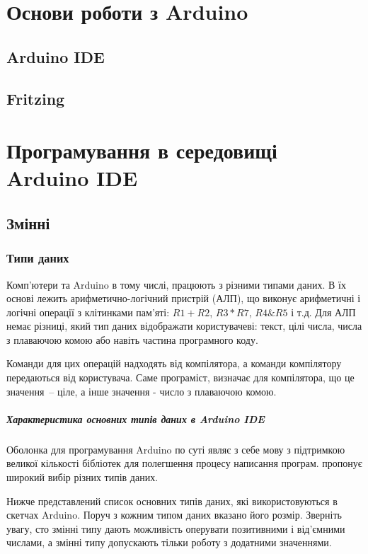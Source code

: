 \documentclass[12pt,a4paper]{book}  %
\begin{document}
\chapter{Основи роботи з Arduino}

\section{Arduino IDE}

\section{Fritzing}

\chapter{Програмування в середовищі\\Arduino IDE}

\section{Змінні}

\subsection{Типи даних}

Комп'ютери та Arduino в тому числі, працюють з різними типами даних. В їх основі лежить арифметично-логічний пристрій (АЛП), що виконує арифметичні і логічні операції з клітинками пам'яті: $R1 + R2$, $R3 * R7$, $R4 \& R5$ і т.д. Для АЛП немає різниці, який тип даних відображати користувачеві: текст, цілі числа, числа з плаваючою комою або навіть частина програмного коду.

Команди для цих операцій надходять від компілятора, а команди компілятору передаються від користувача. Саме програміст, визначає для компілятора, що це значення~-- ціле, а інше значення - число з плаваючою комою.

\paragraph{Характеристика основних типів даних в Arduino IDE}

Оболонка для програмування Arduino по суті являє з себе мову  з підтримкою великої кількості бібліотек для полегшення процесу написання програм.  пропонує широкий вибір різних типів даних.

Нижче представлений список основних типів даних, які використовуються в скетчах Arduino. Поруч з кожним типом даних вказано його розмір. Зверніть увагу, сто змінні типу  дають можливість оперувати позитивними і від'ємними числами, а змінні типу  допускають тільки роботу з додатними значеннями.
\end{document}
